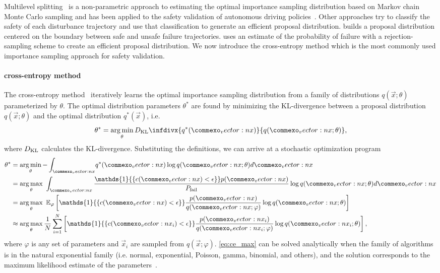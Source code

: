 Multilevel splitting~\cite{kahn1951estimation} is a non-parametric approach to estimating the optimal importance sampling distribution based on Markov chain Monte Carlo sampling and has been applied to the safety validation of autonomous driving policies~\cite{norden2019efficient}. Other approaches try to classify the safety of each disturbance trajectory and use that classification to generate an efficient proposal distribution. \textcite{huang2018versatile} builds a proposal distribution centered on the boundary between safe and unsafe failure trajectories. \textcite{uesato2019rigorous} uses an estimate of the probability of failure with a rejection-sampling scheme to create an efficient proposal distribution. We now introduce the cross-entropy method which is the most commonly used importance sampling approach for safety validation. 

\paragraph{cross-entropy method}
The cross-entropy method~\cite{rubinstein2013cross,de2005tutorial} iteratively learns the optimal importance sampling distribution from a family of distributions $q(\vec{x}; \theta)$ parameterized by $\theta$. The optimal distribution parameters $\theta^*$ are found by minimizing the KL-divergence between a proposal distribution $q(\vec{x}; \theta)$ and the optimal distribution $q^*(\vec{x})$, i.e.
\begin{equation}
    \theta^* = \argmin\limits_\theta D_{\rm KL}\infdivx{q^*(\vec{x})}{ q(\vec{x}; \theta)} \text{,}
\end{equation}
where $D_{\rm KL}$ calculates the KL-divergence. Substituting the definitions, we can arrive at a stochastic optimization program
\begin{equation}
\begin{split}
    \theta^* &= \argmin\limits_\theta {- \int_{\vec{x}}} q^*(\vec{x}) \log q(\vec{x}; \theta) d\vec{x} \\
    &= \argmax\limits_\theta \  \int_{\vec{x}} \frac{\mathds{1}{\{ c(\vec{x}) < \epsilon \}}p(\vec{x})}{P_{\rm fail}} \log q(\vec{x}; \theta) d\vec{x} \\
     &= \argmax\limits_\theta \ \mathbb{E}_{\varphi} \left[ \mathds{1}{\{ c(\vec{x}) < \epsilon \}} \frac{p(\vec{x})}{q(\vec{x}; \varphi)}\log q(\vec{x}; \theta) \right]  \\
     &\approx \argmax\limits_\theta \frac{1}{N} \sum_{i=1}^N \left[ \mathds{1}{\{ c(\vec{x}_i) < \epsilon \}} \frac{p(\vec{x}_i)}{q(\vec{x}_i; \varphi)}\log q(\vec{x}_i; \theta) \right] \label{eq:ce_max} \text{,}
\end{split}
\end{equation}
where $\varphi$ is any set of parameters and $\vec{x}_i$ are sampled from $q(\vec{x}; \varphi)$. \cref{eq:ce_max} can be solved analytically when the family of algorithms is in the natural exponential family (i.e. normal, exponential, Poisson, gamma, binomial, and others), and the solution corresponds to the maximum likelihood estimate of the parameters~\cite{de2005tutorial}.

